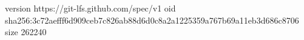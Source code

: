 version https://git-lfs.github.com/spec/v1
oid sha256:3c72aefff6d909ceb7c826ab88d6d0c8a2a1225359a767b69a11eb3d686c8706
size 262240
